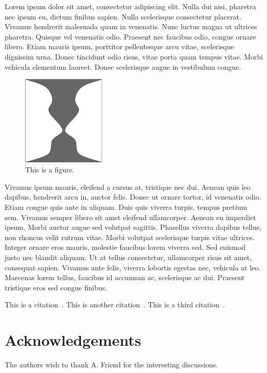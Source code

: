 \documentclass{jgaa-art}
\begin{document}
Lorem ipsum dolor sit amet, consectetur adipiscing elit. Nulla dui nisi, pharetra nec ipsum eu, dictum finibus sapien. Nulla scelerisque consectetur placerat. Vivamus hendrerit malesuada quam in venenatis. Nunc luctus magna ut ultrices pharetra. Quisque vel venenatis odio. Praesent nec faucibus odio, congue ornare libero. Etiam mauris ipsum, porttitor pellentesque arcu vitae, scelerisque dignissim urna. Donec tincidunt odio risus, vitae porta quam tempus vitae. Morbi vehicula elementum laoreet. Donec scelerisque augue in vestibulum congue.

\begin{figure}[htbp]
	\begin{center}
		\includegraphics[width=4cm]{figures/figure1}
	\end{center}
	\caption{This is a figure.}
\end{figure}

Vivamus ipsum mauris, eleifend a cursus at, tristique nec dui. Aenean quis leo dapibus, hendrerit arcu in, auctor felis. Donec ut ornare tortor, id venenatis odio. Etiam congue quis ante in aliquam. Duis quis viverra turpis, tempus pretium sem. Vivamus semper libero sit amet eleifend ullamcorper. Aenean eu imperdiet ipsum. Morbi auctor augue sed volutpat sagittis. Phasellus viverra dapibus tellus, non rhoncus velit rutrum vitae. Morbi volutpat scelerisque turpis vitae ultrices. Integer ornare eros mauris, molestie faucibus lorem viverra sed. Sed euismod justo nec blandit aliquam. Ut at tellus consectetur, ullamcorper risus sit amet, consequat sapien. Vivamus ante felis, viverra lobortis egestas nec, vehicula at leo. Maecenas lorem tellus, faucibus id accumsan ac, scelerisque ac dui. Praesent tristique eros sed congue finibus. 

This is a citation~\cite{g-fpc-01}. This is another citation~\cite{g-spc-03}. This is a third citation~\cite{g-tpc-99}. 



\section*{Acknowledgements}

The authors wish to thank A. Friend for the interesting discussions.



\end{document}
